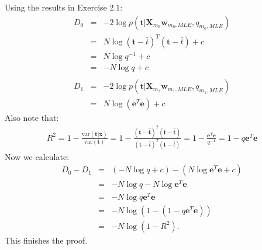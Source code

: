 \documentclass[a4paper, 11pt]{article}
\begin{document}
\newline Using the results in Exercise 2.1:
\begin{eqnarray}
D_0 &=& -2 \log p(\mathbf{t} | \mathbf{X}_{m_0} \mathbf{w}_{m_0, MLE}, q_{m_0, MLE})  \nonumber \\
&=& N \log (\mathbf{t} - \bar{t})^T (\mathbf{t} - \bar{t}) + c \nonumber \\
&=& N \log q^{-1} + c \nonumber \\
&=& - N \log q + c \nonumber \\
\nonumber \\
D_1 &=& -2 \log p(\mathbf{t} | \mathbf{X}_{m_1} \mathbf{w}_{m_1, MLE}, q_{m_1, MLE})  \nonumber \\
&=& N \log (\mathbf{e}^T \mathbf{e}) + c \nonumber
\end{eqnarray}
Also note that:
\begin{eqnarray}
R^2 = 1 - \frac{\text{var}(\mathbf{t} | \mathbf{x}) }{\text{var}(\mathbf{t})} = 1 - \frac{(\mathbf{t} - \hat{\mathbf{t}})^T (\mathbf{t} - \hat{\mathbf{t}})}{(\mathbf{t} - \bar{t})^T (\mathbf{t} - \bar{t})} = 1 - \frac{\mathbf{e}^T \mathbf{e}}{q^{-1}} = 1 - q \mathbf{e}^T \mathbf{e}  \nonumber
\end{eqnarray}
Now we calculate:
\begin{eqnarray}
D_0 - D_1 &=& (-N \log q + c) - (N \log \mathbf{e}^T \mathbf{e} + c) \nonumber \\
&=& -N \log q - N \log \mathbf{e}^T \mathbf{e} \nonumber \\ 
&=& -N  \log q \mathbf{e}^T \mathbf{e} \nonumber \\ 
&=& -N  \log \left(1 - (1 - q \mathbf{e}^T \mathbf{e})\right) \nonumber \\ 
&=& -N  \log \left(1 - R^2 \right). \nonumber
\end{eqnarray}
This finishes the proof.
\end{document}
